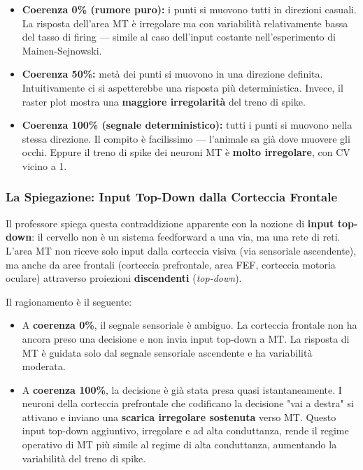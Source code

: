 \begin{itemize}
    \item \textbf{Coerenza 0\% (rumore puro):} i punti si muovono tutti in direzioni casuali. La risposta dell'area MT è irregolare ma con variabilità relativamente bassa del tasso di firing — simile al caso dell'input costante nell'esperimento di Mainen-Sejnowski.
    \item \textbf{Coerenza 50\%:} metà dei punti si muovono in una direzione definita. Intuitivamente ci si aspetterebbe una risposta più deterministica. Invece, il raster plot mostra una \textbf{maggiore irregolarità} del treno di spike.
    \item \textbf{Coerenza 100\% (segnale deterministico):} tutti i punti si muovono nella stessa direzione. Il compito è facilissimo — l'animale sa già dove muovere gli occhi. Eppure il treno di spike dei neuroni MT è \textbf{molto irregolare}, con CV vicino a 1.
\end{itemize}

\subsubsection{La Spiegazione: Input Top-Down dalla Corteccia Frontale}

Il professore spiega questa contraddizione apparente con la nozione di \textbf{input top-down}: il cervello non è un sistema feedforward a una via, ma una rete di reti. L'area MT non riceve solo input dalla corteccia visiva (via sensoriale ascendente), ma anche da aree frontali (corteccia prefrontale, area FEF, corteccia motoria oculare) attraverso proiezioni \textbf{discendenti} (\textit{top-down}).

Il ragionamento è il seguente:
\begin{itemize}
    \item A \textbf{coerenza 0\%}, il segnale sensoriale è ambiguo. La corteccia frontale non ha ancora preso una decisione e non invia input top-down a MT. La risposta di MT è guidata solo dal segnale sensoriale ascendente e ha variabilità moderata.
    \item A \textbf{coerenza 100\%}, la decisione è già stata presa quasi istantaneamente. I neuroni della corteccia prefrontale che codificano la decisione "vai a destra" si attivano e inviano una \textbf{scarica irregolare sostenuta} verso MT. Questo input top-down aggiuntivo, irregolare e ad alta conduttanza, rende il regime operativo di MT più simile al regime di alta conduttanza, aumentando la variabilità del treno di spike.
\end{itemize}


